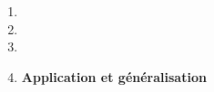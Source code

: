 \begin{enumerate}
      \item
            
      \item
            
      \item
            
      \item \textbf{Application et généralisation}
            
\end{enumerate}
